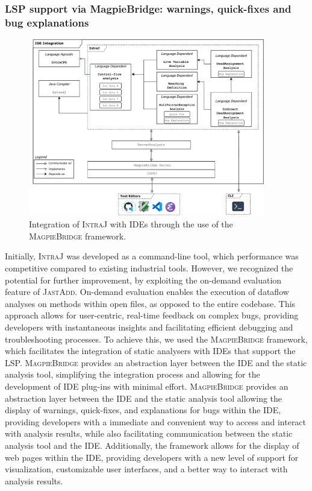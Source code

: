 \subsubsection{LSP support via MagpieBridge: warnings, quick-fixes and bug explanations}
\begin{figure}
  \centering
  \includegraphics[width=0.92\textwidth]{kappa/img/IDEIntegration.pdf}
  \caption{\label{fig:IDEIntegration} Integration of \textsc{IntraJ} with IDEs through the use of the \textsc{MagpieBridge} framework.}
\end{figure}
Initially, \textsc{IntraJ} was developed as a command-line tool, which performance was competitive
compared to existing industrial tools. However, we recognized the potential
for further improvement, by exploiting the on-demand evaluation feature of \textsc{JastAdd}.
On-demand evaluation enables the execution of dataflow analyses
on methods within open files, as opposed to the entire codebase. This approach
allows for user-centric, real-time feedback on complex bugs, providing developers
with instantaneous insights and facilitating efficient debugging and troubleshooting
processes.
To achieve this, we used the \textsc{MagpieBridge} framework, which facilitates the integration
of static analysers with IDEs that support the LSP. \textsc{MagpieBridge} provides an
abstraction layer between the IDE and the static analysis tool, simplifying the
integration process and allowing for the development of IDE plug-ins with minimal effort.
\textsc{MagpieBridge} provides an abstraction layer between the IDE and the static
analysis tool allowing the display of warnings, quick-fixes, and explanations
for bugs within the IDE, providing developers with a immediate and convenient way to
access and interact with analysis results, while also facilitating communication
between the static analysis tool and the IDE. Additionally, the framework allows
for the display of web pages within the IDE, providing developers with a new level
of support for visualization, customizable user interfaces, and a better way to
interact with analysis results.

